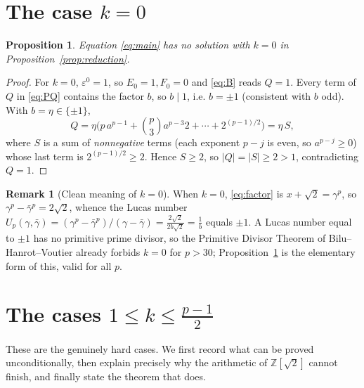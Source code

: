\documentclass{amsart}
\newtheorem{proposition}{Proposition}
\theoremstyle{definition}
\newtheorem{remark}{Remark}
\begin{document}
\section{The case $k=0$}\label{sec:k0}

\begin{proposition}\label{prop:k0}
Equation \eqref{eq:main} has no solution with $k=0$ in
Proposition~\ref{prop:reduction}.
\end{proposition}

\begin{proof}
For $k=0$, $\varepsilon^0=1$, so $E_0=1,F_0=0$ and \eqref{eq:B} reads $Q=1$.
Every term of $Q$ in \eqref{eq:PQ} contains the factor $b$, so $b\mid1$, i.e.
$b=\pm1$ (consistent with $b$ odd). With $b=\eta\in\{\pm1\}$,
\[
Q=\eta\Big(p\,a^{p-1}+\binom p3 a^{p-3}2+\cdots+2^{(p-1)/2}\Big)=\eta\,S,
\]
where $S$ is a sum of \emph{nonnegative} terms (each exponent $p-j$ is even,
so $a^{p-j}\ge0$) whose last term is $2^{(p-1)/2}\ge2$. Hence $S\ge2$, so
$|Q|=|S|\ge2>1$, contradicting $Q=1$.
\end{proof}

\begin{remark}[Clean meaning of $k=0$]
When $k=0$, \eqref{eq:factor} is $x+\sqrt2=\gamma^p$, so
$\gamma^p-\bar\gamma^p=2\sqrt2$, whence the Lucas number
$U_p(\gamma,\bar\gamma)=(\gamma^p-\bar\gamma^p)/(\gamma-\bar\gamma)=\frac{2\sqrt2}{2b\sqrt2}=\frac1b$
equals $\pm1$. A Lucas number equal to $\pm1$ has no primitive prime divisor,
so the Primitive Divisor Theorem of Bilu--Hanrot--Voutier already forbids
$k=0$ for $p>30$; Proposition~\ref{prop:k0} is the elementary form of this,
valid for all $p$.
\end{remark}

\section{The cases $1\le k\le\frac{p-1}{2}$}\label{sec:knonzero}

These are the genuinely hard cases. We first record what can be proved
unconditionally, then explain precisely why the arithmetic of $\mathbb
Z[\sqrt2]$ cannot finish, and finally state the theorem that does.
\end{document}
